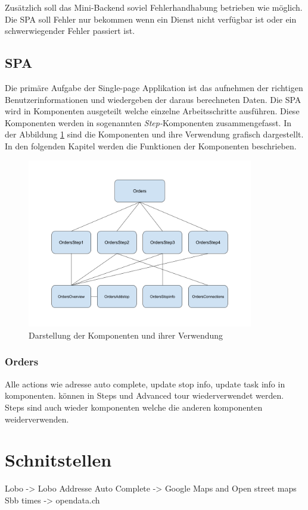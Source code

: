 Zusätzlich soll das Mini-Backend soviel Fehlerhandhabung betrieben wie möglich. Die SPA soll Fehler nur bekommen wenn ein Dienst nicht verfügbar ist oder ein schwerwiegender Fehler passiert ist.

\subsection{SPA}
Die primäre Aufgabe der Single-page Applikation ist das aufnehmen der richtigen Benutzerinformationen und wiedergeben der daraus berechneten Daten. Die SPA wird in Komponenten ausgeteilt welche einzelne Arbeitsschritte ausführen. Diese Komponenten werden in sogenannten \textit{Step-}Komponenten zusammengefasst. In der Abbildung \ref{fig:comparch} sind die Komponenten und ihre Verwendung grafisch dargestellt. In den folgenden Kapitel werden die Funktionen der Komponenten beschrieben.

\begin{figure}[ht]
	\centering
  \includegraphics[width=0.88\textwidth]{images/comparch.png}
	\caption{Darstellung der Komponenten und ihrer Verwendung}
	\label{fig:comparch}
\end{figure}

\subsubsection{Orders}



Alle actions wie adresse auto complete, update stop info, update task info in komponenten. können in Steps und Advanced tour wiederverwendet werden. Steps sind auch wieder komponenten welche die anderen komponenten weiderverwenden.



\section{Schnitstellen}
Lobo -> Lobo
Addresse Auto Complete -> Google Maps and Open street maps
Sbb times -> opendata.ch









